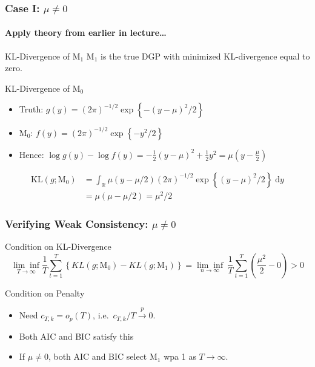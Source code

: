 \begin{frame}
  \frametitle{Case I: $\mu \neq 0$}
  \framesubtitle{Apply theory from earlier in lecture\dots}

  \begin{block}{KL-Divergence of $\text{M}_1$}
    $\text{M}_1$ is the true DGP with minimized KL-divergence equal to zero.
  \end{block}

  \begin{block}{KL-Divergence of $\text{M}_0$}
    \begin{itemize}
      \item Truth: $g(y) = (2\pi)^{-1/2}\exp\left\{ -(y-\mu)^2/2 \right\}$ 
      \item $\text{M}_0$: $f(y) = (2\pi)^{-1/2}\exp\left\{ -y^2/2\right\}$ 
      \item Hence: $\log g(y) - \log f(y) = -\frac{1}{2}(y-\mu)^2 + \frac{1}{2}y^2
          = \mu \left(y - \frac{\mu}{2}\right)$
    \end{itemize}

    \vspace{-1em}
          \begin{align*}
          \text{KL}(g;\text{M}_0) &= \int_{\mathbb{R}}\mu(y - \mu/2) (2\pi)^{-1/2}\exp\left\{ (y-\mu)^2/2 \right\}\; \text{d}y \\
          &= \mu(\mu - \mu/2) = \mu^2 /2
        \end{align*}
  \end{block}

\end{frame}
\begin{frame}
  \frametitle{Verifying Weak Consistency: $\mu \neq 0$}

  \begin{block}{Condition on KL-Divergence}
  \small
  \vspace{-2em}
  \[
    \underset{T\rightarrow \infty}{\lim\inf} \frac{1}{T}\sum_{t = 1}^T \left\{ KL(g; \text{M}_0) - KL(g;\text{M}_1) \right\} = \underset{n\rightarrow \infty}{\lim\inf}\ \frac{1}{T}\sum_{t = 1}^T  \left(\frac{\mu^2}{2} - 0\right) > 0
  \]
\end{block}
\begin{block}{Condition on Penalty}
  \begin{itemize}
    \item Need $c_{T,k} = o_p(T)$, i.e.\ $c_{T,k}/T \overset{p}{\rightarrow} 0$.  
    \item Both AIC and BIC satisfy this
    \item If $\mu \neq 0$, both AIC and BIC select $\text{M}_1$ wpa 1 as $T\rightarrow \infty$.
  \end{itemize}
\end{block}
\end{frame}
